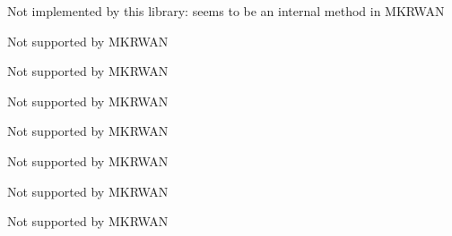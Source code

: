 \begin{DoxyRefList}
%
 Not implemented by this library\+: seems to be an internal method in M\+K\+R\+W\+AN  
\item[Member \mbox{\hyperlink{classSTM32LoRaWAN_a272accb2e14a24773c90ffc932861412}{S\+T\+M32\+Lo\+Ra\+W\+AN::join\+A\+BP}} ()]\label{extensions__extensions000007}%
%
 Not supported by M\+K\+R\+W\+AN  
\item[Member \mbox{\hyperlink{classSTM32LoRaWAN_a36f73d685e3a41c862dfbe82e34f7672}{S\+T\+M32\+Lo\+Ra\+W\+AN::join\+O\+T\+AA}} ()]\label{extensions__extensions000006}%
%
 Not supported by M\+K\+R\+W\+AN  
\item[Member \mbox{\hyperlink{classSTM32LoRaWAN_a27ca1d3572101b8f8a20d7ea4a0ec928}{S\+T\+M32\+Lo\+Ra\+W\+AN::join\+O\+T\+AA}} (uint64\+\_\+t app\+Eui, String app\+Key)]\label{extensions__extensions000005}%
%
 Not supported by M\+K\+R\+W\+AN  
\item[Member \mbox{\hyperlink{classSTM32LoRaWAN_a9e291fe38487b64834e9e252044a7df4}{S\+T\+M32\+Lo\+Ra\+W\+AN::join\+O\+T\+AA}} (uint64\+\_\+t app\+Eui, const char $\ast$app\+Key)]\label{extensions__extensions000003}%
%
 Not supported by M\+K\+R\+W\+AN  
\item[Member \mbox{\hyperlink{classSTM32LoRaWAN_a5d9ea4cf437b233d23b2440463fda6a5}{S\+T\+M32\+Lo\+Ra\+W\+AN::join\+O\+T\+AA}} (uint64\+\_\+t app\+Eui, String app\+Key, uint64\+\_\+t dev\+Eui)]\label{extensions__extensions000004}%
%
 Not supported by M\+K\+R\+W\+AN  
\item[Member \mbox{\hyperlink{classSTM32LoRaWAN_ae9974afa679110e61be69c1cfa5b47ce}{S\+T\+M32\+Lo\+Ra\+W\+AN::join\+O\+T\+AA}} (uint64\+\_\+t app\+Eui, const char $\ast$app\+Key, uint64\+\_\+t dev\+Eui)]\label{extensions__extensions000002}%
%
 Not supported by M\+K\+R\+W\+AN  
\item[Member \mbox{\hyperlink{classSTM32LoRaWAN_a420cf8fb6a886b0e9b950797b1146bba}{S\+T\+M32\+Lo\+Ra\+W\+AN::join\+O\+T\+A\+A\+Async}} ()]\label{extensions__extensions000017}%
%
 Not supported by M\+K\+R\+W\+AN  
\item[Member \mbox{\hyperlink{classSTM32LoRaWAN_a44d6abeff4068edf16a0f8d6f98e544f}{S\+T\+M32\+Lo\+Ra\+W\+AN::last\+Ack}} ()]\label{extensions__extensions000020}%
%

\end{DoxyRefList}
